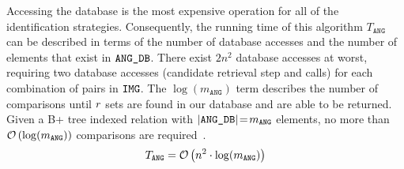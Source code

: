 Accessing the database is the most expensive operation for all of the identification strategies.
Consequently, the running time of this algorithm $T_\texttt{ANG}$ can be described in terms of the number of database accesses and the number of elements that exist in $\texttt{ANG\_DB}$.
There exist $2n^2$ database accesses at worst, requiring two database accesses (candidate retrieval step and  calls) for each combination of pairs in $\texttt{IMG}$.
The $\log (m_\texttt{ANG})$ term describes the number of comparisons until $r$ sets are found in our database and are able to be returned.
Given a B+ tree indexed relation with $\left| \texttt{ANG\_DB} \right|\!=\! m_\texttt{ANG}$ elements, no more than $\mathcal{O} \left( \log(m_\texttt{ANG}) \right)$ comparisons are required~\cite{patel:advanceTreeStructures}.
\begin{equation}\label{eq:complexityAngle}
    T_{\texttt{ANG}} = \bigO\left( n^2 \cdot \log(m_\texttt{ANG}) \right)
\end{equation}


